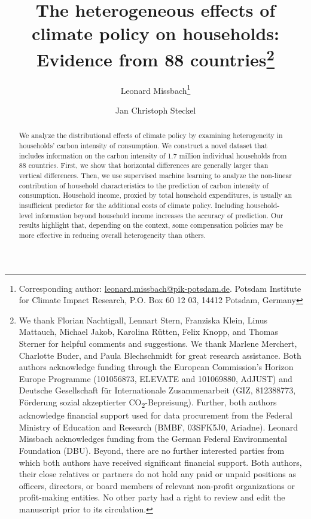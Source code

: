 \documentclass[12pt, a4paper]{article}
\title{The heterogeneous effects of climate policy on households: Evidence from 88 countries\footnote{We thank Florian Nachtigall, Lennart Stern, Franziska Klein, Linus Mattauch, Michael Jakob, Karolina Rütten, Felix Knopp, and Thomas Sterner for helpful comments and suggestions. We thank Marlene Merchert, Charlotte Buder, and Paula Blechschmidt for great research assistance. Both authors acknowledge funding through the European Commission’s Horizon Europe Programme (101056873, ELEVATE and 101069880, AdJUST) and Deutsche Gesellschaft für Internationale Zusammenarbeit (GIZ, 812388773, Förderung sozial akzeptierter CO\textsubscript{2}-Bepreisung). Further, both authors acknowledge financial support used for data procurement from the Federal Ministry of Education and Research (BMBF, 03SFK5J0, Ariadne). Leonard Missbach acknowledges funding from the German Federal Environmental Foundation (DBU). Beyond, there are no further interested parties from which both authors have received significant financial support. Both authors, their close relatives or partners do not hold any paid or unpaid positions as officers, directors, or board members of relevant non-profit organizations or profit-making entities. No other party had a right to review and edit the manuscript prior to its circulation.}}
\author[1]{Leonard Missbach\footnote{Corresponding author: \href{mailto:leonard.missbach@pik-potsdam.de}{leonard.missbach@pik-potsdam.de}. Potsdam Institute for Climate Impact Research, P.O. Box 60 12 03, 14412 Potsdam, Germany}}
\author[1,2]{Jan Christoph Steckel}
\affil[1]{\small Potsdam Institute for Climate Impact Research (PIK), Potsdam, Germany}
\affil[2]{\small Technical University of Munich, Munich, Germany}
\begin{document}

\vspace{30mm}



\thispagestyle{empty}
\clearpage

\linenumbers
\modulolinenumbers[5]

\begin{abstract}
  We analyze the distributional effects of climate policy by examining heterogeneity in households' carbon intensity of consumption. We construct a novel dataset that includes information on the carbon intensity of 1.7 million individual households from 88 countries. First, we show that horizontal differences are generally larger than vertical differences. Then, we use supervised machine learning to analyze the non-linear contribution of household characteristics to the prediction of carbon intensity of consumption. Household income, proxied by total household expenditures, is usually an insufficient predictor for the additional costs of climate policy. Including household-level information beyond household income increases the accuracy of prediction. Our results highlight that, depending on the context, some compensation policies may be more effective in reducing overall heterogeneity than others.    
\end{abstract}
\end{document}
